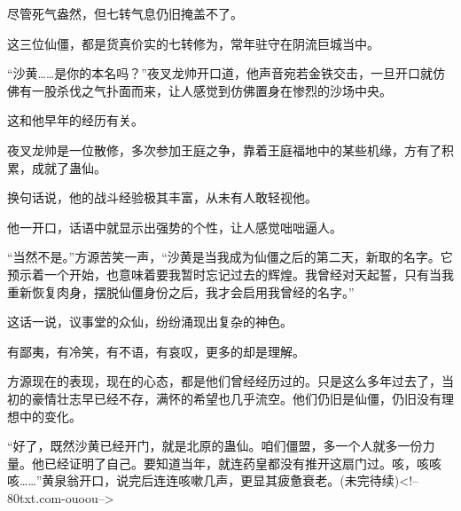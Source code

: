 \begin{this_body}
尽管死气盎然，但七转气息仍旧掩盖不了。

这三位仙僵，都是货真价实的七转修为，常年驻守在阴流巨城当中。

“沙黄……是你的本名吗？”夜叉龙帅开口道，他声音宛若金铁交击，一旦开口就仿佛有一股杀伐之气扑面而来，让人感觉到仿佛置身在惨烈的沙场中央。

这和他早年的经历有关。

夜叉龙帅是一位散修，多次参加王庭之争，靠着王庭福地中的某些机缘，方有了积累，成就了蛊仙。

换句话说，他的战斗经验极其丰富，从未有人敢轻视他。

他一开口，话语中就显示出强势的个性，让人感觉咄咄逼人。

“当然不是。”方源苦笑一声，“沙黄是当我成为仙僵之后的第二天，新取的名字。它预示着一个开始，也意味着要我暂时忘记过去的辉煌。我曾经对天起誓，只有当我重新恢复肉身，摆脱仙僵身份之后，我才会启用我曾经的名字。”

这话一说，议事堂的众仙，纷纷涌现出复杂的神色。

有鄙夷，有冷笑，有不语，有哀叹，更多的却是理解。

方源现在的表现，现在的心态，都是他们曾经经历过的。只是这么多年过去了，当初的豪情壮志早已经不存，满怀的希望也几乎流空。他们仍旧是仙僵，仍旧没有理想中的变化。

“好了，既然沙黄已经开门，就是北原的蛊仙。咱们僵盟，多一个人就多一份力量。他已经证明了自己。要知道当年，就连药皇都没有推开这扇门过。咳，咳咳咳……”黄泉翁开口，说完后连连咳嗽几声，更显其疲惫衰老。(未完待续)<!--80txt.com-ouoou-->

\end{this_body}

